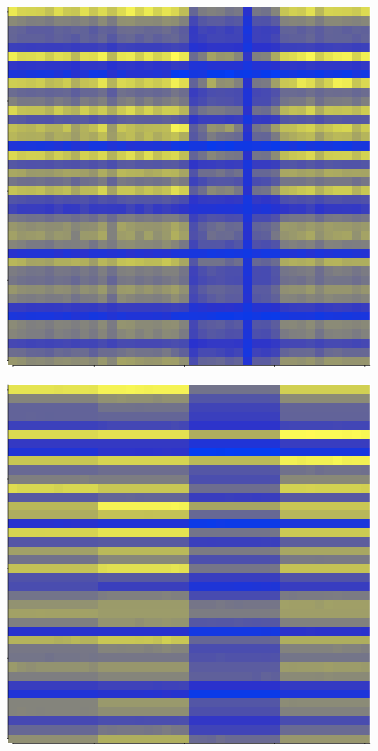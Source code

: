 \begin{figure}
\centering
\begin{minipage}{.5\textwidth}
  \centering
  \includegraphics[width=1\linewidth]{num_pred_mf.png}
  \label{fig:test3}
\end{minipage}%
\begin{minipage}{.5\textwidth}
  \centering
  \includegraphics[width=1\linewidth]{num_pred_mf_crf.png}
  \label{fig:test4}
\end{minipage}
\end{figure}


